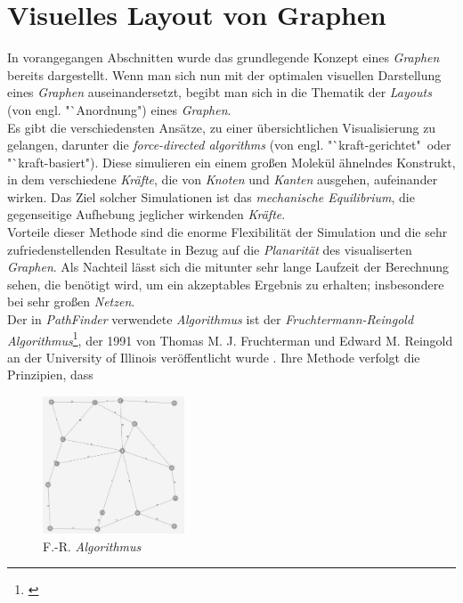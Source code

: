 \documentclass[12pt]{article}
\begin{document}
\section{Visuelles Layout von Graphen}
\label{sec:layout}
In vorangegangen Abschnitten wurde das grundlegende Konzept eines \textit{Graphen} bereits dargestellt. Wenn man sich nun mit der optimalen visuellen Darstellung eines \textit{Graphen} auseinandersetzt, begibt man sich in die Thematik der \textit{Layouts} (von engl. "`Anordnung") eines \textit{Graphen}.
\\ 
Es gibt die verschiedensten Ansätze, zu einer übersichtlichen Visualisierung zu gelangen, darunter die \textit{force-directed algorithms} (von engl. "`kraft-gerichtet"\ oder "`kraft-basiert")\cite{force-directed}. Diese simulieren ein einem großen Molekül ähnelndes Konstrukt, in dem verschiedene \textit{Kräfte}, die von \textit{Knoten} und \textit{Kanten} ausgehen, aufeinander wirken. Das Ziel solcher Simulationen ist das \textit{mechanische Equilibrium}, die gegenseitige Aufhebung jeglicher wirkenden \textit{Kräfte}.
\\
Vorteile dieser Methode sind die enorme Flexibilität der Simulation und die sehr zufriedenstellenden Resultate in Bezug auf die \textit{Planarität} des visualiserten \textit{Graphen}. Als Nachteil lässt sich die mitunter sehr lange Laufzeit der Berechnung sehen, die benötigt wird, um ein akzeptables Ergebnis zu erhalten; insbesondere bei sehr großen \textit{Netzen}.
\\
Der in \textit{PathFinder} verwendete \textit{Algorithmus} ist der \textit{Fruchtermann-Reingold Algorithmus}\footnote{\cite[Kapitel 12.3, S. 386f]{force-directed2}}, der 1991 von Thomas M. J. Fruchterman und Edward M. Reingold an der University of Illinois veröffentlicht wurde \cite{fruchterman}. Ihre Methode verfolgt die Prinzipien, dass
\begin{figure}
\vspace{-20pt}
\begin{center}
\includegraphics[width=0.375\textwidth]{res/graph_2.png}
\end{center}
\vspace{-30pt}
\centering
\caption{F.-R. \textit{Algorithmus}}
\label{fig:graph_2}
\end{figure}
\end{document}
